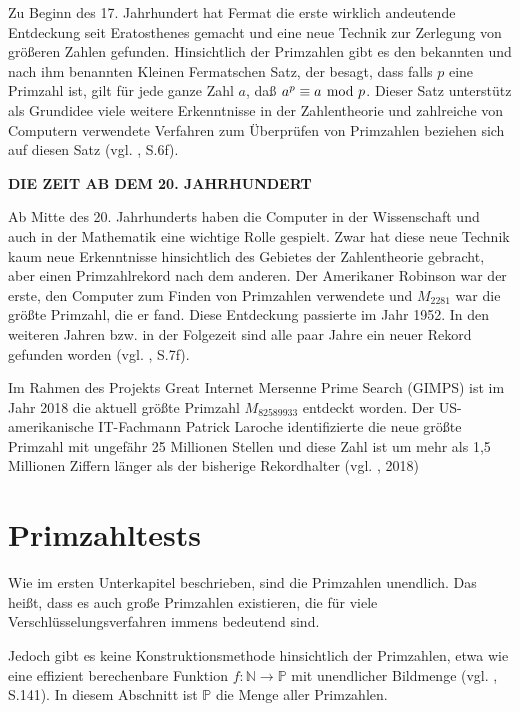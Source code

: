 Zu Beginn des 17. Jahrhundert hat Fermat die erste
wirklich andeutende Entdeckung seit Eratosthenes gemacht
und eine neue Technik zur Zerlegung von größeren Zahlen
gefunden. Hinsichtlich der Primzahlen gibt es den bekannten
und nach ihm benannten Kleinen Fermatschen Satz, der besagt,
dass falls $p$ eine Primzahl ist, gilt für jede ganze Zahl
$a$, daß $a^p \equiv a \mskip-5mu\mod p$. Dieser Satz unterstütz als
Grundidee viele weitere Erkenntnisse in der Zahlentheorie
und zahlreiche von Computern verwendete Verfahren zum
Überprüfen von Primzahlen beziehen sich auf diesen Satz
(vgl. \cite{sasgabor}, S.6f).
\vspace*{.4cm}

\textbf{DIE ZEIT AB DEM 20. JAHRHUNDERT}

Ab Mitte des 20. Jahrhunderts haben die Computer in der
Wissenschaft und auch in der Mathematik eine wichtige
Rolle gespielt. Zwar hat diese neue Technik kaum neue
Erkenntnisse hinsichtlich des Gebietes der Zahlentheorie
gebracht, aber einen Primzahlrekord nach dem anderen.
Der Amerikaner Robinson war der erste, den Computer zum
Finden von Primzahlen verwendete und $M_{2281}$ war die
größte Primzahl, die er fand. Diese Entdeckung passierte
im Jahr 1952. In den weiteren Jahren bzw. in der Folgezeit
sind alle paar Jahre ein neuer Rekord gefunden worden
(vgl. \cite{sasgabor}, S.7f).

Im Rahmen des Projekts Great Internet Mersenne Prime Search
(GIMPS) ist im Jahr 2018 die aktuell größte Primzahl
$M_{82589933}$ entdeckt worden. Der US-amerikanische
IT-Fachmann Patrick Laroche identifizierte die neue größte
Primzahl mit ungefähr 25 Millionen Stellen und diese Zahl
ist um mehr als 1,5 Millionen Ziffern länger als der
bisherige Rekordhalter
(vgl. \cite{derstandard}, 2018)
\newpage


\section{Primzahltests}

Wie im ersten Unterkapitel beschrieben, sind die Primzahlen
unendlich. Das heißt, dass es auch große Primzahlen
existieren, die für viele Verschlüsselungsverfahren immens
bedeutend sind.

Jedoch gibt es keine Konstruktionsmethode hinsichtlich der
Primzahlen, etwa wie eine effizient berechenbare Funktion
$f : \mathbb{N} \to \mathbb{P}$ mit unendlicher Bildmenge
(vgl. \cite{karpfingerkiechle}, S.141).
In diesem Abschnitt ist $\mathbb{P}$ die Menge aller
Primzahlen.

